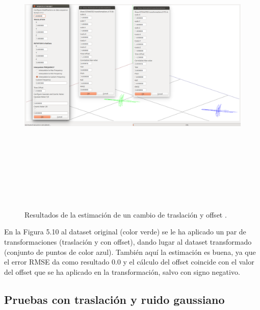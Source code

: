 \begin{figure}[H]
\begin{center}
\label{fig:opciones de View}\includegraphics[height=14.0cm,width=18.0cm]{img/cap6/Trasla_Offset_abba.png}
\hspace{0.5cm}

\end{center}

\caption{Resultados de la estimación de un cambio de traslación y offset .}
\end{figure}
En la Figura 5.10 al dataset original (color verde) se le ha aplicado un par de transformaciones (traslación y con offset), dando lugar al dataset transformado (conjunto de puntos de color azul). También aquí la estimación es buena, ya que el error RMSE da como resultado 0.0 y el cálculo del offset  coincide con el valor del offset que se ha aplicado en la transformación, salvo con signo negativo.

\subsection{Pruebas con traslación y ruido gaussiano}

